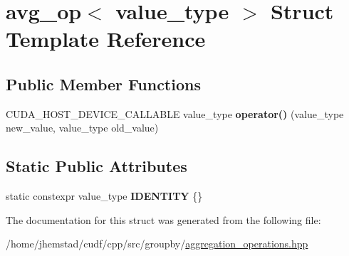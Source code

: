 \hypertarget{structavg__op}{}\section{avg\+\_\+op$<$ value\+\_\+type $>$ Struct Template Reference}
\label{structavg__op}
\subsection*{Public Member Functions}
\begin{DoxyCompactItemize}
\item 
C\+U\+D\+A\+\_\+\+H\+O\+S\+T\+\_\+\+D\+E\+V\+I\+C\+E\+\_\+\+C\+A\+L\+L\+A\+B\+LE value\+\_\+type {\bfseries operator()} (value\+\_\+type new\+\_\+value, value\+\_\+type old\+\_\+value)\hypertarget{structavg__op_a46da45e59cca19026996e24bcffaeb8d}{}\label{structavg__op_a46da45e59cca19026996e24bcffaeb8d}

\end{DoxyCompactItemize}
\subsection*{Static Public Attributes}
\begin{DoxyCompactItemize}
\item 
static constexpr value\+\_\+type {\bfseries I\+D\+E\+N\+T\+I\+TY} \{\}\hypertarget{structavg__op_a4173e90c2536f7eb66d57e6a017dff42}{}\label{structavg__op_a4173e90c2536f7eb66d57e6a017dff42}

\end{DoxyCompactItemize}


The documentation for this struct was generated from the following file\+:\begin{DoxyCompactItemize}
\item 
/home/jhemstad/cudf/cpp/src/groupby/\hyperlink{aggregation__operations_8hpp}{aggregation\+\_\+operations.\+hpp}\end{DoxyCompactItemize}
